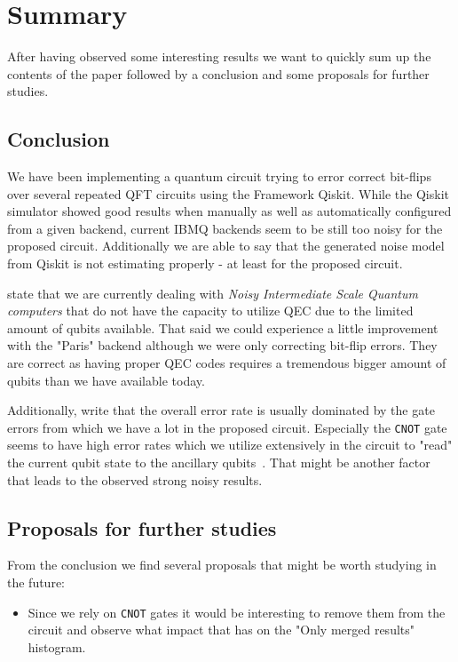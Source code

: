 \section{Summary}
\label{sec:summary}

After having observed some interesting results we want to quickly sum up the contents of the paper followed by a conclusion and some proposals for further studies.

\subsection{Conclusion}
\label{subsec:conclusion}

We have been implementing a quantum circuit trying to error correct bit-flips over several repeated QFT circuits using the Framework Qiskit.
While the Qiskit simulator showed good results when manually as well as automatically configured from a given backend, current IBMQ backends seem to be still too noisy for the proposed circuit.
Additionally we are able to say that the generated noise model from Qiskit is not estimating properly - at least for the proposed circuit.

 state that we are currently dealing with \emph{Noisy Intermediate Scale Quantum computers} that do not have the capacity to utilize QEC due to the limited amount of qubits available.
That said we could experience a little improvement with the "Paris" backend although we were only correcting bit-flip errors.
They are correct as having proper QEC codes requires a tremendous bigger amount of qubits than we have available today.

Additionally,  write that the overall error rate is usually dominated by the gate errors from which we have a lot in the proposed circuit.
Especially the \texttt{CNOT} gate seems to have high error rates which we utilize extensively in the circuit to "read" the current qubit state to the ancillary qubits~\cite[p. 3]{tannu2018case}.
That might be another factor that leads to the observed strong noisy results.

\subsection{Proposals for further studies}
\label{subsec:proposals-for-further-studies}

From the conclusion we find several proposals that might be worth studying in the future:

\begin{itemize}
    \item Since we rely on \texttt{CNOT} gates it would be interesting to remove them from the circuit and observe what impact that has on the "Only merged results" histogram.
\end{itemize}
